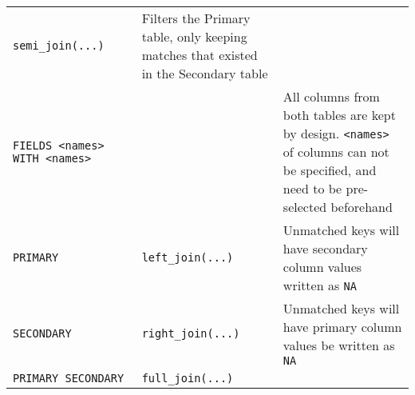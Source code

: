 \documentclass[
]{book}
\begin{document}
\begin{longtable}[]{@{}lll@{}}
\begin{minipage}[t]{0.30\columnwidth}
\texttt{semi\_join(...)}\strut
\end{minipage} & \begin{minipage}[t]{0.30\columnwidth}\raggedright
Filters the Primary table, only keeping matches that existed in the Secondary table\strut
\end{minipage}\tabularnewline
\begin{minipage}[t]{0.30\columnwidth}\raggedright
\texttt{FIELDS\ \textless{}names\textgreater{}} \texttt{WITH\ \textless{}names\textgreater{}}\strut
\end{minipage} & \begin{minipage}[t]{0.30\columnwidth}\raggedright
\strut
\end{minipage} & \begin{minipage}[t]{0.30\columnwidth}\raggedright
All columns from both tables are kept by design. \texttt{\textless{}names\textgreater{}} of columns can not be specified, and need to be pre-selected beforehand\strut
\end{minipage}\tabularnewline
\begin{minipage}[t]{0.30\columnwidth}\raggedright
\texttt{PRIMARY}\strut
\end{minipage} & \begin{minipage}[t]{0.30\columnwidth}\raggedright
\texttt{left\_join(...)}\strut
\end{minipage} & \begin{minipage}[t]{0.30\columnwidth}\raggedright
Unmatched keys will have secondary column values written as \texttt{NA}\strut
\end{minipage}\tabularnewline
\begin{minipage}[t]{0.30\columnwidth}\raggedright
\texttt{SECONDARY}\strut
\end{minipage} & \begin{minipage}[t]{0.30\columnwidth}\raggedright
\texttt{right\_join(...)}\strut
\end{minipage} & \begin{minipage}[t]{0.30\columnwidth}\raggedright
Unmatched keys will have primary column values be written as \texttt{NA}\strut
\end{minipage}\tabularnewline
\begin{minipage}[t]{0.30\columnwidth}\raggedright
\texttt{PRIMARY\ SECONDARY}\strut
\end{minipage} & \begin{minipage}[t]{0.30\columnwidth}\raggedright
\texttt{full\_join(...)}\strut
\end{minipage} & \begin{minipage}[t]{0.30\columnwidth}\raggedright

\end{minipage}
\end{longtable}
\end{document}
